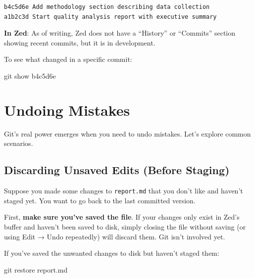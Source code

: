 \documentclass[
  letterpaper,
  DIV=11,
  numbers=noendperiod]{scrreprt}
\newenvironment{Shaded}{\begin{snugshade}}{\end{snugshade}}
\newcommand{\FunctionTok}[1]{\textcolor[rgb]{0.28,0.35,0.67}{#1}}
\newcommand{\NormalTok}[1]{\textcolor[rgb]{0.00,0.23,0.31}{#1}}
\begin{document}
\begin{verbatim}
b4c5d6e Add methodology section describing data collection
a1b2c3d Start quality analysis report with executive summary
\end{verbatim}

\textbf{In Zed}: As of writing, Zed does not have a ``History'' or
``Commits'' section showing recent commits, but it is in development.

To see what changed in a specific commit:

\begin{codelisting}

\caption{\texttt{terminal}}

\begin{Shaded}
\begin{Highlighting}[]
\FunctionTok{git}\NormalTok{ show b4c5d6e}
\end{Highlighting}
\end{Shaded}

\end{codelisting}

\section{Undoing Mistakes}\label{undoing-mistakes}

Git's real power emerges when you need to undo mistakes. Let's explore
common scenarios.

\subsection{Discarding Unsaved Edits (Before
Staging)}\label{discarding-unsaved-edits-before-staging}

Suppose you made some changes to \texttt{report.md} that you don't like
and haven't staged yet. You want to go back to the last committed
version.

First, \textbf{make sure you've saved the file}. If your changes only
exist in Zed's buffer and haven't been saved to disk, simply closing the
file without saving (or using Edit → Undo repeatedly) will discard them.
Git isn't involved yet.

If you've saved the unwanted changes to disk but haven't staged them:

\begin{codelisting}

\caption{\texttt{terminal}}

\begin{Shaded}
\begin{Highlighting}[]
\FunctionTok{git}\NormalTok{ restore report.md}
\end{Highlighting}
\end{Shaded}

\end{codelisting}
\end{document}
